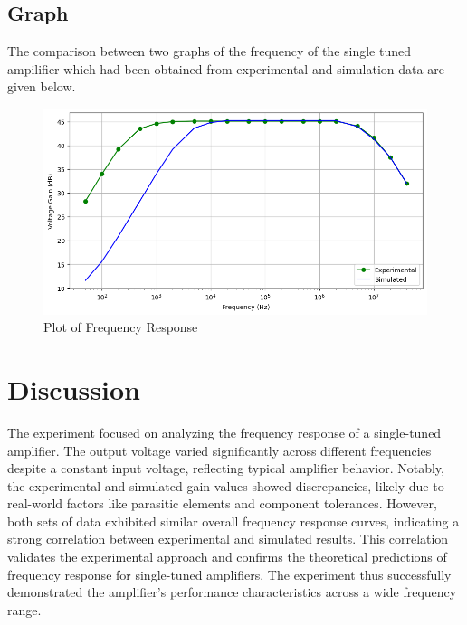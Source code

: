 \documentclass[12pt]{article}
\begin{document}
\subsection{Graph}
The comparison between two graphs of the frequency of the single tuned ampilifier which had been obtained from experimental and simulation data are given below.

\begin{figure}[htpb]
    \centering
    \includegraphics[width=.8\textwidth]{Graph.png}
    \caption{Plot of Frequency Response}
\end{figure}

\section{Discussion}
The experiment focused on analyzing the frequency response of a single-tuned amplifier. The output voltage varied significantly across different frequencies despite a constant input voltage, reflecting typical amplifier behavior. Notably, the experimental and simulated gain values showed discrepancies, likely due to real-world factors like parasitic elements and component tolerances. However, both sets of data exhibited similar overall frequency response curves, indicating a strong correlation between experimental and simulated results. This correlation validates the experimental approach and confirms the theoretical predictions of frequency response for single-tuned amplifiers. The experiment thus successfully demonstrated the amplifier's performance characteristics across a wide frequency range.
\end{document}
